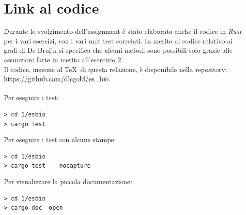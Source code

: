 \documentclass[a4paper,12pt, oneside]{book}
\begin{document}
\chapter{Link al codice}
Durante lo svolgimento dell'assignment è stato elaborato anche il codice in
\textit{Rust} per i vari esercizi, con i vari unit test correlati. In merito al
codice relativo ai grafi di De Bruijn si specifica che alcuni metodi sono
possibili solo grazie alle assunzioni fatte in merito all'esercizio 2.\\
Il codice, insieme al \TeX\,  di questa relazione, è disponibile nella
repository: \url{https://github.com/dlcgold/es_bio}.\\
\\
Per eseguire i test:
\begin{shaded}
  \noindent
  \texttt{> cd 1/esbio}\\
  \texttt{> cargo test}
\end{shaded}
\noindent
Per eseguire i test con alcune stampe:
\begin{shaded}
  \noindent
  \texttt{> cd 1/esbio}\\
  \texttt{> cargo test -- --nocapture}
\end{shaded}
\noindent
Per visualizzare la piccola documentazione:
\begin{shaded}
  \noindent
  \texttt{> cd 1/esbio}\\
  \texttt{> cargo doc --open}
\end{shaded}
\end{document}
